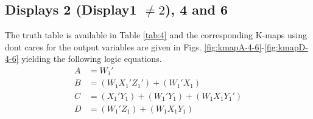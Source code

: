 
\subsection{Displays 2 (Display1 $\ne 2$), 4 and 6}
The truth table is available in 
Table 
\ref{tab:4}
and the corresponding K-maps using dont cares for the output variables are given in 
Figs. \ref{fig:kmapA-4-6}-\ref{fig:kmapD-4-6} yielding the following logic equations.
\begin{align}
    A &= W_1' \\
    B &= (W_1 X_1' Z_1') + (W_1' X_1) \\
    C &= (X_1' Y_1) + (W_1' Y_1) + (W_1 X_1 Y_1') \\
    D &= (W_1' Z_1) + (W_1 X_1 Y_1) 
\end{align}
\begin{table}[!h]
\centering

\caption{}
\label{tab:4}
\end{table}

